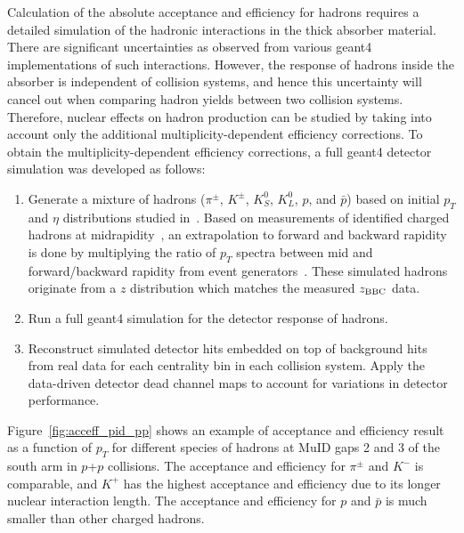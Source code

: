 \documentclass[twocolumn,letterpaper,aps,prc,longbibliography,superscriptaddress,nofootinbib,floatfix]{revtex4-2}
\newcommand{\zbbc}{\mbox{$z_{\rm BBC}$}\xspace}
\newcommand{\pt}{\mbox{$p_T$}\xspace}
\newcommand{\pp}{\mbox{$p$+$p$}\xspace}
\newcommand{\geant}{\mbox{{\sc geant4}}\xspace}
\begin{document}
Calculation of the absolute acceptance and efficiency for hadrons 
requires a detailed simulation of the hadronic interactions in the thick 
absorber material. There are significant uncertainties as observed from 
various \geant implementations of such interactions. However, the 
response of hadrons inside the absorber is independent of collision 
systems, and hence this uncertainty will cancel out when comparing 
hadron yields between two collision systems. Therefore, nuclear effects 
on hadron production can be studied by taking into account only the 
additional multiplicity-dependent efficiency corrections. To 
obtain the multiplicity-dependent efficiency corrections, a full \geant 
detector simulation was developed as follows:
\begin{enumerate}

\item Generate a mixture of hadrons ($\pi^{\pm}$, $K^{\pm}$, 
$K^{0}_{S}$, $K^{0}_{L}$, $p$, and $\bar{p}$) based on initial \pt and 
$\eta$ distributions studied in~\cite{Adare:2012px,Adare:2013lkk}. Based 
on measurements of identified charged hadrons at 
midrapidity~\cite{Adare:2011vy,Agakishiev:2011dc,Adare:2013esx}, an 
extrapolation to forward and backward rapidity is done by multiplying 
the ratio of \pt spectra between mid and forward/backward rapidity from 
event generators~\cite{Sjostrand:2006za,Gyulassy:1994ew}. These 
simulated hadrons originate from a $z$ distribution which matches the 
measured \zbbc data.

\item Run a full \geant simulation for the detector response of hadrons.

\item Reconstruct simulated detector hits embedded on top of background 
hits from real data for each centrality bin in each collision system.  
Apply the data-driven detector dead channel maps to account for 
variations in detector performance.

\end{enumerate}

Figure~\ref{fig:acceff_pid_pp} shows an example of acceptance and 
efficiency result as a function of \pt for different species of hadrons 
at MuID gaps 2 and 3 of the south arm in \pp collisions. The acceptance 
and efficiency for $\pi^{\pm}$ and $K^{-}$ is comparable, and $K^{+}$ 
has the highest acceptance and efficiency due to its longer nuclear 
interaction length. The acceptance and efficiency for $p$ and $\bar{p}$ 
is much smaller than other charged hadrons.
\end{document}
